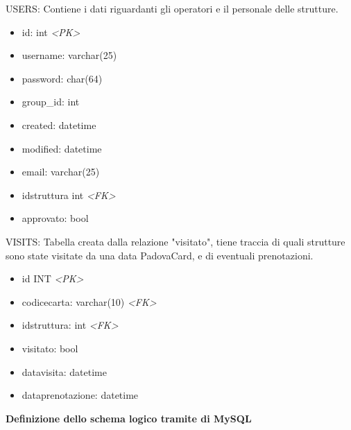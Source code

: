 USERS: Contiene i dati riguardanti gli operatori e il personale delle strutture.
\begin{itemize}
\item id: int \textit{\textless PK\textgreater}
\item username: varchar(25)
\item password: char(64)
\item group\_id: int
\item created: datetime
\item modified: datetime
\item email: varchar(25)
\item idstruttura int \textit{\textless FK\textgreater}
\item approvato: bool
\end{itemize}
VISITS: Tabella creata dalla relazione "visitato", tiene traccia di quali strutture sono state visitate da una data PadovaCard, e di eventuali prenotazioni.
\begin{itemize}
\item id INT \textit{\textless PK\textgreater}
\item codicecarta: varchar(10) \textit{\textless FK\textgreater}
\item idstruttura: int \textit{\textless FK\textgreater}
\item visitato: bool
\item datavisita: datetime
\item dataprenotazione: datetime
\end{itemize}
\textbf{Definizione dello schema logico tramite  di MySQL}
\lstset{frame=single}
